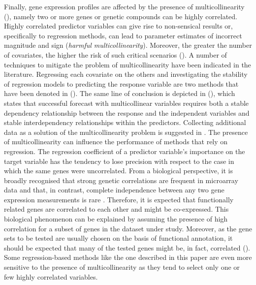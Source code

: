 Finally, gene expression profiles are affected by the presence of multicollinearity (\citealp{est_multicoll, ml_multicoll}), namely two or more genes or genetic compounds can be highly correlated. Highly correlated predictor variables can give rise to non-sensical results or, specifically to regression methods, can lead to parameter estimates of incorrect magnitude and sign (\emph{harmful multicollinearity}). Moreover, the greater the number of covariates, the higher the risk of such critical scenarios (\citealp{multicollinearity_kvs}).  
A number of techniques to mitigate the problem of multicollinearity have been indicated in the literature. Regressing each covariate on the others and investigating the stability of regression models to predicting the response variable are two methods that have been denoted in (\citealp{multicollinearity_kvs}). The same line of conclusion is depicted in (\citealp{farrar1964multicollinearity}), which states that successful forecast with multicollinear variables requires both a stable dependency relationship between the response and the independent variables and stable interdependency relationships within the predictors. Collecting additional data as a solution of the multicollinearity problem is suggested in \citealp{multicollinearity_kvs, farrar1964multicollinearity}.
The presence of multicollinearity can influence the performance of methods that rely on regression. The regression coefficient of a predictor variable's importance on the target variable has the tendency to lose precision with respect to the case in which the same genes were uncorrelated. 
From a biological perspective, it is broadly recognised that strong genetic correlations are frequent in microarray data and that, in contrast, complete independence between any two gene expression measurements is rare \citealp{Goeman2007}. Therefore, it is expected that functionally related genes are correlated to each other and might be co-expressed. This biological phenomenon can be explained by assuming the presence of high correlation for a subset of genes in the dataset under study. Moreover, as the gene sets to be tested are usually chosen on the basis of functional annotation, it should be expected that many of the tested genes might be, in fact, correlated (\citealp{genesets}).
Some regression-based methods like the one described in this paper are even more sensitive to the presence of multicollinearity as they tend to select only one or few highly correlated variables.

